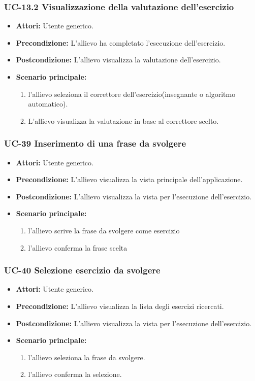 	\subsubsection{UC-13.2 Visualizzazione della valutazione dell'esercizio}
	\begin{itemize}
			\item \textbf{Attori:} Utente generico.
			\item \textbf{Precondizione:} L'allievo ha completato l'esecuzione dell'esercizio.
			\item \textbf{Postcondizione:} L'allievo visualizza la valutazione dell'esercizio.
			\item \textbf{Scenario principale:}
				\begin{enumerate}
					\item l'allievo seleziona il correttore dell'esercizio(insegnante o algoritmo automatico).
					\item L'allievo visualizza la valutazione in base al correttore scelto.
				\end{enumerate}
	\end{itemize}				
			
	\subsubsection{UC-39 Inserimento di una frase da svolgere}
	\begin{itemize}
		\item \textbf{Attori:} Utente generico.
		\item \textbf{Precondizione:} L'allievo visualizza la vista principale dell'applicazione.
		\item \textbf{Postcondizione:} L'allievo visualizza la vista per l'esecuzione dell'esercizio.
		\item \textbf{Scenario principale:}
		\begin{enumerate}
			\item l'allievo scrive la frase da svolgere come esercizio
			\item l'allievo conferma la frase scelta
		\end{enumerate}
	\end{itemize}

	\subsubsection{UC-40 Selezione esercizio da svolgere}
	\begin{itemize}
			\item \textbf{Attori:} Utente generico.
			\item \textbf{Precondizione:} L'allievo visualizza la lista degli esercizi ricercati.
			\item \textbf{Postcondizione:} L'allievo visualizza la vista per l'esecuzione dell'esercizio.
			\item \textbf{Scenario principale:}
			\begin{enumerate}
					\item l'allievo seleziona la frase da svolgere.
					\item l'allievo conferma la selezione.
			\end{enumerate}
	\end{itemize}

